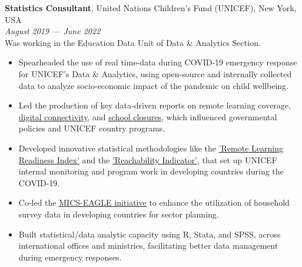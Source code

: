 \documentclass[11pt,a4paper,sans]{moderncv}
\begin{document}
\noindent \textbf{Statistics Consultant}, United Nations Children's Fund (UNICEF), New York, USA \\
\textit{August 2019 — June 2022} \\
Was working in the Education Data Unit of Data \& Analytics Section.
\begin{itemize}[noitemsep]
    \item Spearheaded the use of real time-data during COVID-19 emergency response for UNICEF's Data \& Analytics, using open-source and internally collected data to analyze socio-economic impact of the pandemic on child wellbeing. 
    \item Led the production of key data-driven reports on remote learning coverage, \href{https://data.unicef.org/resources/children-and-young-people-internet-access-at-home-during-covid19/}{\underline{digital connectivity}}, and \href{https://data.unicef.org/resources/one-year-of-covid-19-and-school-closures/}{\underline{school closures}}, which influenced governmental policies and UNICEF country programs. 
    \item Developed innovative statistical methodologies like the  \href{https://data.unicef.org/resources/remote-learning-readiness-index/}{\underline{'Remote Learning Readiness Index'}} and the \href{https://data.unicef.org/resources/remote-learning-reachability-factsheet/}{\underline{'Reachability Indicator'}}, that set up UNICEF internal monitoring and program work in developing countries during the COVID-19.
    \item Co-led the \href{https://data.unicef.org/resources/mics-education-analysis-for-global-learning-and-equity/}{\underline{MICS-EAGLE initiative}} to enhance the utilization of household survey data in developing countries for sector planning.
    \item Built statistical/data analytic capacity using R, Stata, and SPSS, across international offices and ministries, facilitating better data management during emergency responses.
\end{itemize}
\end{document}

